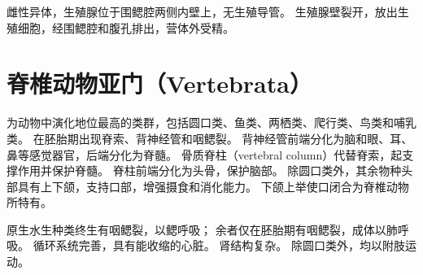 \documentclass[11pt]{article}
\begin{document}
\newline

雌性异体，生殖腺位于围鳃腔两侧内壁上，无生殖导管。
生殖腺壁裂开，放出生殖细胞，经围鳃腔和腹孔排出，营体外受精。
  
\section{脊椎动物亚门（Vertebrata）}
为动物中演化地位最高的类群，包括圆口类、鱼类、两栖类、爬行类、鸟类和哺乳类。
在胚胎期出现脊索、背神经管和咽鳃裂。
背神经管前端分化为脑和眼、耳、鼻等感觉器官，后端分化为脊髓。
骨质脊柱（vertebral column）代替脊索，起支撑作用并保护脊髓。
脊柱前端分化为头骨，保护脑部。
除圆口类外，其余物种头部具有上下颌，支持口部，增强摄食和消化能力。
下颌上举使口闭合为脊椎动物所特有。

\newline

原生水生种类终生有咽鳃裂，以鳃呼吸；
余者仅在胚胎期有咽鳃裂，成体以肺呼吸。
循环系统完善，具有能收缩的心脏。
肾结构复杂。
除圆口类外，均以附肢运动。
\end{document}
